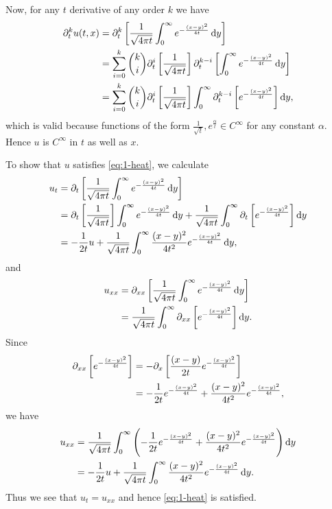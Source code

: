 \documentclass{article}
\begin{document}
Now, for any $t$ derivative of any order $k$ we have
%
\begin{align*}
    \partial_t^k u(t, x)
        &= \partial_t^k \sbr{\frac{1}{\sqrt{4 \pi t}} \int_0^\infty e^{-\frac{(x - y)^2}{4t }} \dif y} \\
        &= \sum_{i = 0}^k \binom{k}{i} \partial_t^i \sbr{\frac{1}{\sqrt{4 \pi t}}} \partial_t^{k - i} \sbr{\int_0^\infty e^{-\frac{(x - y)^2}{4t }} \dif y} \\
        &= \sum_{i = 0}^k \binom{k}{i} \partial_t^i \sbr{\frac{1}{\sqrt{4 \pi t}}} \int_0^\infty \partial_t^{k - i} \sbr{e^{-\frac{(x - y)^2}{4t}}} \dif y
        ,
\end{align*}
%
which is valid because functions of the form
$\frac{1}{\sqrt{t}}, e^{\frac{\alpha}{t}} \in C^\infty$ for any constant
$\alpha$. Hence $u$ is $C^\infty$ in $t$ as well as $x$.

To show that $u$ satisfies \eqref{eq:1-heat}, we calculate
%
\begin{align*}
    u_t
        &= \partial_t \sbr{\frac{1}{\sqrt{4 \pi t}} \int_0^\infty e^{-\frac{(x - y)^2}{4t }} \dif y} \\
        &= \partial_t \sbr{\frac{1}{\sqrt{4 \pi t}}} \int_0^\infty e^{-\frac{(x - y)^2}{4t }} \dif y
            + \frac{1}{\sqrt{4 \pi t}} \int_0^\infty \partial_t \sbr{e^{-\frac{(x - y)^2}{4t }}} \dif y \\
        &= - \frac{1}{2t} u + \frac{1}{\sqrt{4 \pi t}} \int_0^\infty \frac{(x - y)^2}{4t^2} e^{-\frac{(x - y)^2}{4t }} \dif y
        ,
\end{align*}
%
and
%
\begin{align*}
    u_{xx}
        &= \partial_{xx} \sbr{\frac{1}{\sqrt{4 \pi t}} \int_0^\infty e^{-\frac{(x - y)^2}{4t}} \dif y} \\
        &= \frac{1}{\sqrt{4 \pi t}} \int_0^\infty \partial_{xx} \sbr{e^{-\frac{(x - y)^2}{4t}}} \dif y
        .
\end{align*}
%
Since
%
\begin{align*}
    \partial_{xx} \sbr{e^{-\frac{(x - y)^2}{4t}}}
        &= - \partial_x \sbr{\frac{(x - y)}{2t} e^{-\frac{(x - y)^2}{4t}}} \\
        &= - \frac{1}{2t} e^{-\frac{(x - y)^2}{4t}} + \frac{(x - y)^2}{4 t^2} e^{-\frac{(x - y)^2}{4t}}
        ,
\end{align*}
%
we have
%
\begin{align*}
    u_{xx}
        &= \frac{1}{\sqrt{4 \pi t}} \int_0^\infty \del{
            - \frac{1}{2t} e^{-\frac{(x - y)^2}{4t}} + \frac{(x - y)^2}{4 t^2} e^{-\frac{(x - y)^2}{4t}}
           } \dif y \\
        &= - \frac{1}{2t} u + \frac{1}{\sqrt{4 \pi t}} \int_0^\infty \frac{(x - y)^2}{4t^2} e^{-\frac{(x - y)^2}{4t}} \dif y
        .
\end{align*}
%
Thus we see that $u_t = u_{xx}$ and hence \eqref{eq:1-heat} is satisfied.
\end{document}

